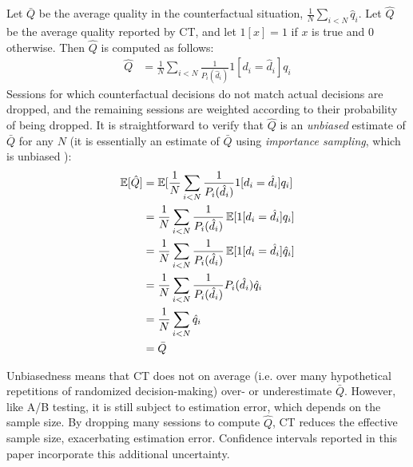Let $\bar{Q}$ be the average quality in the counterfactual situation, $\frac{1}{N} \sum_{i < N} \hat{q}_i$.  Let $\hat{Q}$ be the average quality reported by CT, and let $1[x] = 1$ if $x$ is true and $0$ otherwise.  Then $\hat{Q}$ is computed as follows:
\begin{align*}
  \hat{Q} &= \frac{1}{N} \sum_{i < N} \frac{1}{P_i(\hat{d}_i)} 1[d_i = \hat{d}_i] q_i
\end{align*}
Sessions for which counterfactual decisions do not match actual decisions are dropped, and the remaining sessions are weighted according to their probability of being dropped.  It is straightforward to verify that $\hat{Q}$ is an {\it unbiased} estimate of $\bar{Q}$ for any $N$ (it is essentially an estimate of $\bar{Q}$ using {\it importance sampling}, which is unbiased \cite{something}):
\begin{align*}
    \operatorname{\mathbb{E}}[\hat{Q}] &= \operatorname{\mathbb{E}}[\frac{1}{N} \sum_{i < N} \frac{1}{P_i(\hat{d}_i)} 1[d_i = \hat{d}_i] q_i] \\
    &= \frac{1}{N} \sum_{i < N} \frac{1}{P_i(\hat{d}_i)} \operatorname{\mathbb{E}}[1[d_i = \hat{d}_i] q_i] \\
    &= \frac{1}{N} \sum_{i < N} \frac{1}{P_i(\hat{d}_i)} \operatorname{\mathbb{E}}[1[d_i = \hat{d}_i] \hat{q}_i] \\
    &= \frac{1}{N} \sum_{i < N} \frac{1}{P_i(\hat{d}_i)} P_i(\hat{d}_i) \hat{q}_i \\
    &= \frac{1}{N} \sum_{i < N} \hat{q}_i \\
    &= \bar{Q}
\end{align*}

Unbiasedness means that CT does not on average (i.e. over many hypothetical repetitions of randomized decision-making) over- or underestimate $\bar{Q}$.  However, like A/B testing, it is still subject to estimation error, which depends on the sample size.  By dropping many sessions to compute $\hat{Q}$, CT reduces the effective sample size, exacerbating estimation error.  Confidence intervals reported in this paper incorporate this additional uncertainty.